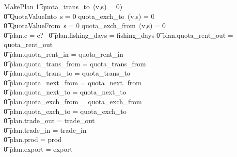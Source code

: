 \documentclass[11pt]{article}
\begin{document}
\begin{schema}{MakePlan}
        \t1     quota\_trans\_to~(v,s) = 0) \land  {} \\       
        \t0 QuotaValueInto~s = 0 \implies quota\_exch\_to~(v,s) = 0 \land {}\\
        \t0 QuotaValueFrom~s = 0 \implies quota\_exch\_from~(v,s) = 0  \\
\zbreak
        \t0 plan.c = c? \
        \t0 plan.fishing\_days = fishing\_days \land 
        \t0 plan.quota\_rent\_out = quota\_rent\_out  \land \\
        \t0 plan.quota\_rent\_in = quota\_rent\_in \land \\
        \t0 plan.quota\_trans\_from = quota\_trans\_from \land \\
        \t0 plan.quota\_trans\_to = quota\_trans\_to \land \\
        \t0 plan.quota\_next\_from = quota\_next\_from \land \\
        \t0 plan.quota\_next\_to = quota\_next\_to \land \\
        \t0 plan.quota\_exch\_from = quota\_exch\_from \land \\
        \t0 plan.quota\_exch\_to = quota\_exch\_to \land \\
        \t0 plan.trade\_out = trade\_out \land \\
        \t0 plan.trade\_in = trade\_in \land \\
        \t0 plan.prod = prod \land \\
        \t0 plan.export = export \\
\end{schema}
\end{document}
